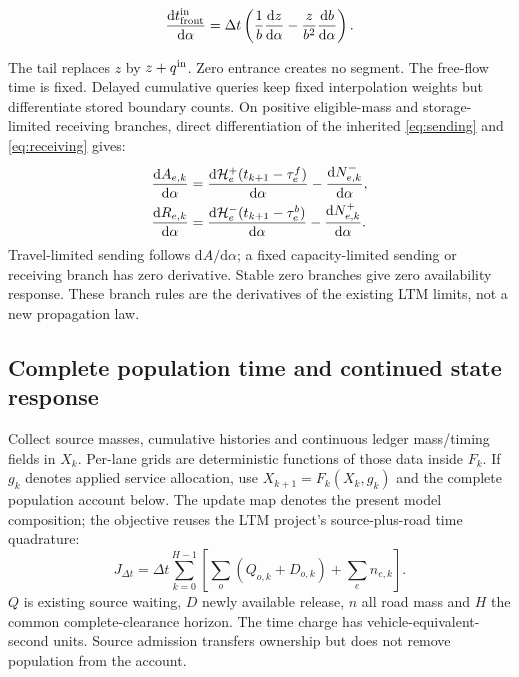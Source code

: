 \documentclass[10pt,a4paper]{article}
\newcommand{\rev}[1]{{\color{revisionred}#1}}
\begin{document}
\begin{equation}
 \frac{\mathrm dt^{\rm in}_{\rm front}}{\mathrm d\alpha}
 =\Delta t\left(\frac1b\frac{\mathrm dz}{\mathrm d\alpha}
       -\frac z{b^2}\frac{\mathrm db}{\mathrm d\alpha}\right).
 \label{eq:entry-derivative}
\end{equation}

The tail replaces $z$ by $z+q^{\rm in}$. Zero entrance creates no segment.
The free-flow time is fixed. Delayed cumulative queries keep fixed
interpolation weights but differentiate stored boundary counts. On
positive eligible-mass and storage-limited receiving branches,
\rev{direct differentiation of the inherited \eqref{eq:sending} and \eqref{eq:receiving} gives:}
\begin{equation}
 \begin{aligned}
 \frac{\mathrm dA_{e,k}}{\mathrm d\alpha}
 &=\frac{\mathrm d{\cal H}^+_e(t_{k+1}-\tau^f_e)}{\mathrm d\alpha}
                     -\frac{\mathrm dN^-_{e,k}}{\mathrm d\alpha},\\
 \frac{\mathrm dR_{e,k}}{\mathrm d\alpha}
 &=\frac{\mathrm d{\cal H}^-_e(t_{k+1}-\tau^b_e)}{\mathrm d\alpha}
                     -\frac{\mathrm dN^+_{e,k}}{\mathrm d\alpha}.
 \end{aligned}
 \label{eq:ltm-derivative}
\end{equation}
Travel-limited sending follows $\mathrm dA/\mathrm d\alpha$; a fixed
capacity-limited sending or receiving branch has zero derivative.
Stable zero branches give zero availability response. These branch rules
are the derivatives of the existing LTM limits, not a new propagation law.
\par

\par\begin{samepage}
\section{Complete population time and continued state response}


Collect source masses, cumulative histories and continuous ledger
mass/timing fields in $X_k$. Per-lane grids are deterministic functions
of those data inside $F_k$. If $g_k$ denotes applied service allocation,
use $X_{k+1}=F_k(X_k,g_k)$ and the complete population account below.
\rev{The update map denotes the present model composition; the objective reuses the LTM project's source-plus-road time quadrature:}
\begin{equation}
 J_{\Delta t}=\Delta t\sum_{k=0}^{H-1}
 \left[\sum_o(Q_{o,k}+D_{o,k})+\sum_en_{e,k}\right].
 \label{eq:tst}
\end{equation}
$Q$ is existing source waiting, $D$ newly available release, $n$ all road
mass and $H$ the common complete-clearance horizon. The time charge has
vehicle-equivalent-second units. Source admission transfers ownership but
does not remove population from the account.
\par\end{samepage}
\end{document}
